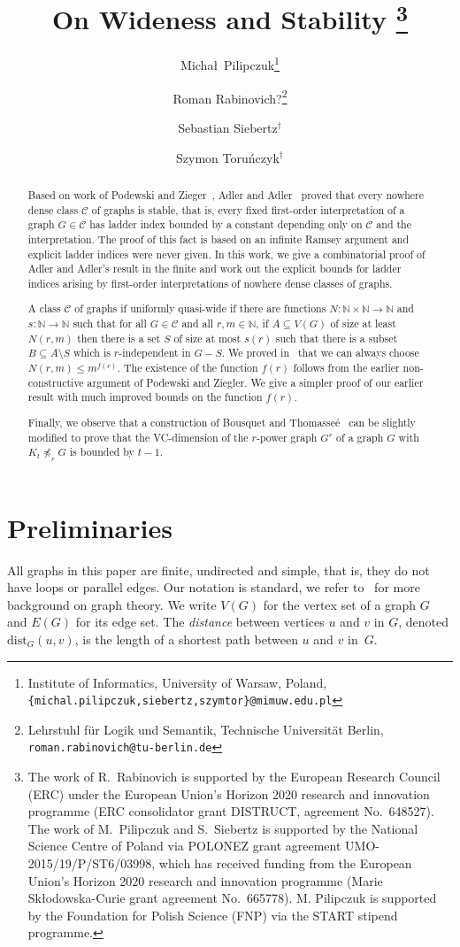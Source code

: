 \documentclass[11pt, fleqn]{article}
\title{On Wideness and Stability
\thanks{
The work of R.\ Rabinovich is supported by the
European Research Council (ERC) under the European Union's Horizon
2020 research and innovation programme (ERC consolidator grant DISTRUCT,
agreement No.\ 648527).
The work of M.\ Pilipczuk and S.\ Siebertz is supported by the National Science Centre of 
Poland via POLONEZ grant agreement UMO-2015/19/P/ST6/03998, 
which has received funding from the European Union's Horizon 2020 research and 
innovation programme (Marie Sk\l odowska-Curie grant agreement No.\ 665778).
M. Pilipczuk is supported by the Foundation for Polish Science (FNP) via the START stipend programme.
}}
\author{
Micha\l~Pilipczuk\thanks{Institute of Informatics, University of Warsaw, Poland, \texttt{\{michal.pilipczuk,siebertz,szymtor\}@mimuw.edu.pl}}
\and Roman Rabinovich?\thanks{Lehrstuhl f\"ur Logik und Semantik, Technische Universit\"at Berlin, \texttt{roman.rabinovich@tu-berlin.de}}
\and Sebastian Siebertz$^\dagger$
\and Szymon Toru{\'n}czyk$^\dagger$}
\theoremstyle{plain}
\theoremstyle{nonumberplain}
\newcommand{\CCC}{\mathcal{C}}
\newcommand{\N}{\mathbb{N}}
\newcommand{\minor}{\preccurlyeq}
\newcommand{\dist}{\mathrm{dist}}
\begin{document}
\maketitle

\begin{abstract}
\noindent 
Based on work of Podewski and Zieger~\cite{podewski1978stable}, 
Adler and Adler~\cite{adler2014interpreting}
proved that every nowhere dense class $\CCC$ of graphs is stable, that is, 
every fixed first-order interpretation of a graph $G\in \CCC$ has 
ladder index bounded by a constant depending only on $\CCC$ and 
the interpretation. The proof of this fact is based on an infinite
Ramsey argument and explicit ladder indices were never given. 
In this work, we give a combinatorial proof of Adler and Adler's result in 
the finite and work out the explicit bounds for ladder indices arising
by first-order interpretations of nowhere dense classes of graphs. 


A class $\CCC$ of graphs if uniformly quasi-wide if there are functions 
$N:\N\times\N\rightarrow\N$ and $s:\N\rightarrow\N$ such 
that for all $G\in \CCC$ and all $r,m\in \N$, if $A\subseteq V(G)$
of size at least $N(r,m)$ then there is a set $S$ of size at most $s(r)$
such that there is a subset $B\subseteq A\setminus S$ which is
$r$-independent in $G-S$. We proved in~\cite{siebertz2016polynomial} 
that we can always choose $N(r,m)\leq m^{f(r)}$. The existence of the 
function $f(r)$ follows 
from the earlier non-constructive argument of Podewski and Ziegler. 
We give a simpler proof of our earlier result with much improved bounds 
on the function $f(r)$.

Finally, we observe that a construction of Bousquet and 
Thomasse\'e~\cite{BousquetT15} can be slightly modified to prove that 
the VC-dimension of the $r$-power graph $G^r$ of a graph $G$
with $K_t\not\minor_r G$ is bounded by $t-1$.
\end{abstract}

\section{Preliminaries}

All graphs in this paper are finite, undirected and simple, that is, 
they do not have loops or parallel edges. Our notation is standard,
we refer to~\cite{diestel2012graph} for more background on 
graph theory. 
We write $V(G)$ for the vertex set of a graph $G$ and
$E(G)$ for its edge set. 
The {\em{distance}} between vertices $u$ and $v$ in $G$, denoted $\dist_G(u,v)$, is the length of a shortest path between $u$ and $v$ in~$G$.
\end{document}
